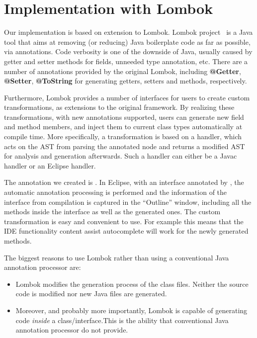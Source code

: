 \section{Implementation with Lombok}

Our implementation is based on extension to Lombok. Lombok project~\cite{lombok}
is a Java tool that aims at removing (or reducing) Java boilerplate code as far
as possible, via annotations. Code verbosity is one of the downside of Java,
usually caused by getter and setter methods for fields, unneeded type
annotation, etc. There are a number of annotations provided by the original
Lombok, including \textbf{@Getter}, \textbf{@Setter}, \textbf{@ToString} for
generating getters, setters and  methods, respectively.

Furthermore, Lombok provides a number of interfaces for users to create custom
transformations, as extensions to the original framework. By realizing these
transformations, with new annotations supported, users can generate new field
and method members, and inject them to current class types automatically at
compile time. More specifically, a transformation is based on a handler, which
acts on the AST from parsing the annotated node and returns a modified AST for
analysis and generation afterwards. Such a handler can either be a Javac handler
or an Eclipse handler.

The annotation we created is \mixin. In Eclipse, with an interface annotated by
\mixin, the automatic annotation processing is performed and the information of
the interface from compilation is captured in the ``Outline'' window, including
all the methods inside the interface as well as the generated ones.  The custom
transformation is easy and convenient to use.  For example this means that the
IDE functionality content assist autocomplete will work for the newly generated
methods.

 The biggest reasons to use Lombok rather than using a conventional Java
 annotation processor are:
\begin{itemize}
\item Lombok modifies the generation process of the class files. Neither the
  source code is modified nor new Java files are generated.
\item Moreover, and probably more importantly, Lombok is capable of generating
  code \emph{inside} a class/interface.This is the ability that conventional
  Java annotation processor do not provide.
\end{itemize}

